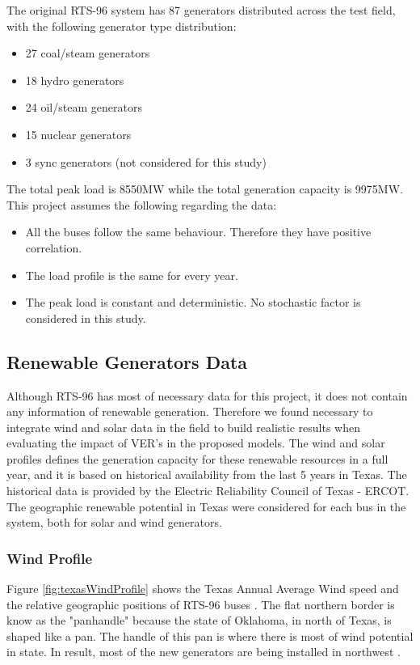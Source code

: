 \documentclass[12pt,LUDisStyle,twosided]{book}
\begin{document}
The original RTS-96 system has 87 generators distributed across the test field, with the following generator type distribution:

\begin{itemize}
\item 27 coal/steam generators
\item 18 hydro generators
\item 24 oil/steam generators
\item 15 nuclear generators
\item 3 sync generators (not considered for this study)
\end{itemize}

The total peak load is 8550MW while the total generation capacity is 9975MW. This project assumes the following regarding the data:

\begin{itemize}
\item All the buses follow the same behaviour. Therefore they have positive correlation.
\item The load profile is the same for every year.
\item The peak load is constant and deterministic. No stochastic factor is considered in this study.
\end{itemize}


\subsection{Renewable Generators Data}

Although RTS-96 has most of necessary data for this project, it does not contain any information of renewable generation. Therefore we found necessary to integrate wind and solar data in the field to build realistic results when evaluating the impact of VER's in the proposed models. The wind and solar profiles defines the generation capacity for these renewable resources in a full year, and it is based on historical availability from the last 5 years in Texas.  The historical data is provided by the Electric Reliability Council of Texas - ERCOT. The geographic renewable potential in Texas were considered for each bus in the system, both for solar and wind generators.

\subsubsection{Wind Profile}


Figure \ref{fig:texasWindProfile} shows the Texas Annual Average Wind speed and the relative geographic positions of RTS-96 buses \cite{wongieee}. The flat northern border is know as the "panhandle" because the state of Oklahoma, in north of Texas, is shaped like a pan. The handle of this pan is where there is most of wind potential in state. In result, most of the new generators are being installed in northwest \cite{texasWindProfile}.
\end{document}
